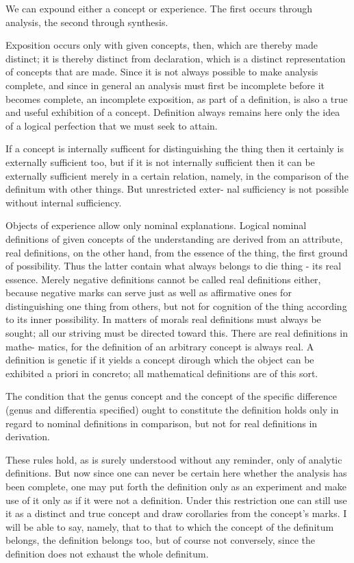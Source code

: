     We can expound either a concept or experience.
    The first occurs through analysis, the second through synthesis.

    Exposition occurs only with given concepts, then, which are thereby made distinct;
    it is thereby distinct from declaration, which is a distinct representation of concepts that are made.
    Since it is not always possible to make analysis complete, and
    since in general an analysis must first be incomplete before it becomes complete,
    an incomplete exposition, as part of a definition, is also a true and useful
    exhibition of a concept. Definition always remains here only the idea of a
    logical perfection that we must seek to attain.

    If a concept is internally sufficent for distinguishing the thing then it
    certainly is externally sufficient too, but if it is not internally sufficient
    then it can be externally sufficient merely in a certain relation, namely, in
    the comparison of the definitum with other things. But unrestricted exter-
    nal sufficiency is not possible without internal sufficiency.

    Objects of experience allow only nominal explanations. Logical nominal
    definitions of given concepts of the understanding are derived from an
    attribute, real definitions, on the other hand, from the essence of the
    thing, the first ground of possibility. Thus the latter contain what always
    belongs to die thing - its real essence. Merely negative definitions cannot
    be called real definitions either, because negative marks can serve just as
    well as affirmative ones for distinguishing one thing from others, but not
    for cognition of the thing according to its inner possibility.
    In matters of morals real definitions must always be sought; all our
    striving must be directed toward this. There are real definitions in mathe-
    matics, for the definition of an arbitrary concept is always real.
    A definition is genetic if it yields a concept dirough which the object can be
    exhibited a priori in concreto; all mathematical definitions are of this sort.

    The condition that the genus concept and the concept of the specific
    difference (genus and differentia specified) ought to constitute the definition
    holds only in regard to nominal definitions in comparison, but not for real
    definitions in derivation.

    These rules hold, as is surely understood without any reminder, only of
    analytic definitions. But now since one can never be certain here whether
    the analysis has been complete, one may put forth the definition only as
    an experiment and make use of it only as if it were not a definition. Under
    this restriction one can still use it as a distinct and true concept and draw
    corollaries from the concept's marks. I will be able to say, namely, that to
    that to which the concept of the definitum belongs, the definition belongs
    too, but of course not conversely, since the definition does not exhaust
    the whole definitum.

